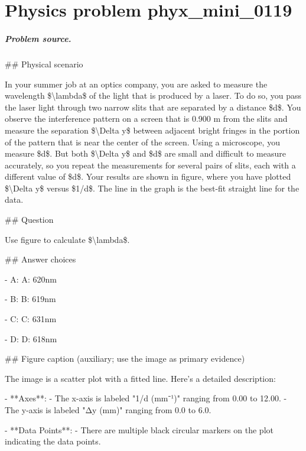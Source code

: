 
\chapter{Physics problem phyx\_mini\_0119}
\label{ch:PhyXMiniProblems_problem_phyx_mini_0119}

\paragraph{Problem source.}
\#\# Physical scenario

In your summer job at an optics company, you are asked to measure the wavelength \$\textbackslash{}lambda\$ of the light that is produced by a laser. To do so, you pass the laser light through two narrow slits that are separated by a distance \$d\$. You observe the interference pattern on a screen that is 0.900 m from the slits and measure the separation \$\textbackslash{}Delta y\$ between adjacent bright fringes in the portion of the pattern that is near the center of the screen. Using a microscope, you measure \$d\$. But both \$\textbackslash{}Delta y\$ and \$d\$ are small and difficult to measure accurately, so you repeat the measurements for several pairs of slits, each with a different value of \$d\$. Your results are shown in figure, where you have plotted \$\textbackslash{}Delta y\$ versus \$1/d\$. The line in the graph is the best-fit straight line for the data.

\#\# Question

Use figure to calculate \$\textbackslash{}lambda\$.

\#\# Answer choices

- A: A: 620nm

- B: B: 619nm

- C: C: 631nm

- D: D: 618nm

\#\# Figure caption (auxiliary; use the image as primary evidence)

The image is a scatter plot with a fitted line. Here's a detailed description:

- **Axes**: 
  - The x-axis is labeled "1/d (mm⁻¹)" ranging from 0.00 to 12.00.
  - The y-axis is labeled "Δy (mm)" ranging from 0.0 to 6.0.
  
- **Data Points**: 
  - There are multiple black circular markers on the plot indicating the data points.
  
